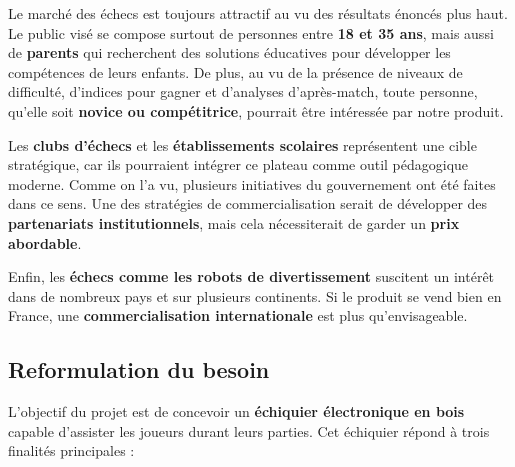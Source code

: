 \documentclass{article}
\begin{document}
Le marché des échecs est toujours attractif au vu des résultats énoncés plus haut. Le public visé se compose surtout de personnes entre \textbf{18 et 35 ans}, mais aussi de \textbf{parents} qui recherchent des solutions éducatives pour développer les compétences de leurs enfants. De plus, au vu de la présence de niveaux de difficulté, d’indices pour gagner et d’analyses d’après-match, toute personne, qu’elle soit \textbf{novice ou compétitrice}, pourrait être intéressée par notre produit.

Les \textbf{clubs d’échecs} et les \textbf{établissements scolaires} représentent une cible stratégique, car ils pourraient intégrer ce plateau comme outil pédagogique moderne. Comme on l’a vu, plusieurs initiatives du gouvernement ont été faites dans ce sens. Une des stratégies de commercialisation serait de développer des \textbf{partenariats institutionnels}, mais cela nécessiterait de garder un \textbf{prix abordable}.

Enfin, les \textbf{échecs comme les robots de divertissement} suscitent un intérêt dans de nombreux pays et sur plusieurs continents. Si le produit se vend bien en France, une \textbf{commercialisation internationale} est plus qu’envisageable.

\subsection{Reformulation du besoin}

L’objectif du projet est de concevoir un \textbf{échiquier électronique en bois} capable d’assister les joueurs durant leurs parties.  
Cet échiquier répond à trois finalités principales :
\end{document}
